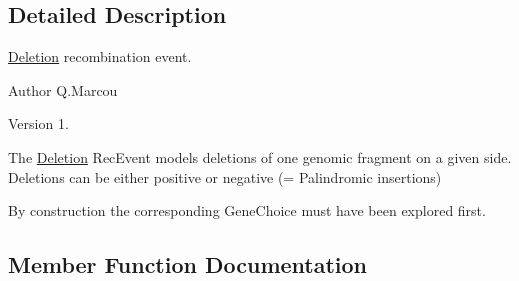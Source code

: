 \subsection{Detailed Description}
\hyperlink{classDeletion}{Deletion} recombination event. 

\begin{DoxyAuthor}{Author}
Q.\+Marcou 
\end{DoxyAuthor}
\begin{DoxyVersion}{Version}
1.
\end{DoxyVersion}
The \hyperlink{classDeletion}{Deletion} Rec\+Event models deletions of one genomic fragment on a given side. Deletions can be either positive or negative (= Palindromic insertions)

By construction the corresponding Gene\+Choice must have been explored first. 

\subsection{Member Function Documentation}
\mbox{\label{classDeletion_a2479968a06062e87027f8acef2631211}} 
